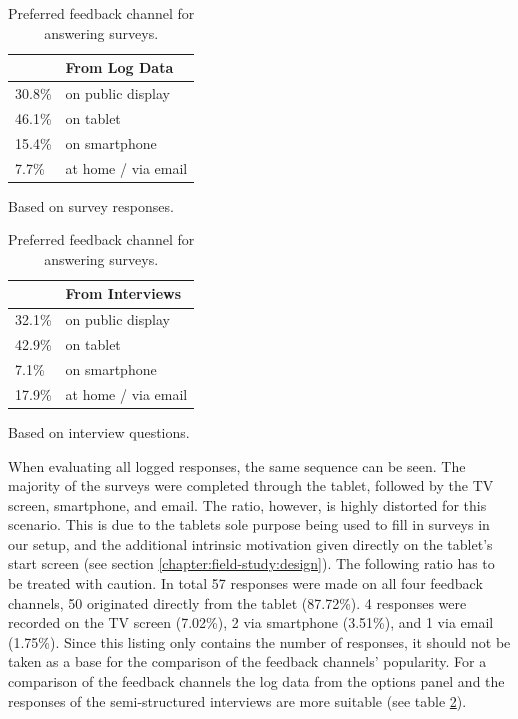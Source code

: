 	\begin{table}[h]



	\parbox{.45\linewidth}{
		\centering
	    \begin{tabular}{ll}
	    \toprule
	    & \textbf{From Log Data}     \\
	    \midrule
	    30.8\%       & on public display     \\
	    46.1\%       & on tablet         \\
	    15.4\%       &  on smartphone          \\
	    7.7\%        &  at home / via email        \\
	    \bottomrule
	    \end{tabular}   
		\caption{Based on survey responses.}
	}
	\hfill
	\parbox{.45\linewidth}{
		\centering
	    \begin{tabular}{ll}
	    \toprule
	    & \textbf{From Interviews} \\
	    \midrule
	    32.1\%       & on public display     \\
	    42.9\%       & on tablet         \\
	    7.1\%       &  on smartphone          \\
	    17.9\%        &  at home / via email        \\
	    \bottomrule
	    \end{tabular} 
   		\caption{Based on interview questions.}
	}


		\caption[Feedback Channel]{Preferred feedback channel for answering surveys.}
		\label{table:5-feedback-channel}
	\end{table}


	When evaluating all logged responses, the same sequence can be seen. The majority of the surveys were completed through the tablet, followed by the TV screen, smartphone, and email. The ratio, however, is highly distorted for this scenario. This is due to the tablets sole purpose being used to fill in surveys in our setup, and the additional intrinsic motivation given directly on the tablet's start screen (see section \ref{chapter:field-study:design}). The following ratio has to be treated with caution. In total 57 responses were made on all four feedback channels, 50 originated directly from the tablet (87.72\%). 4 responses were recorded on the TV screen (7.02\%), 2 via smartphone (3.51\%), and 1 via email (1.75\%). Since this listing only contains the number of responses, it should not be taken as a base for the comparison of the feedback channels' popularity. %
	For a comparison of the feedback channels the log data from the options panel and the responses of the semi-structured interviews are more suitable (see table \ref{table:5-feedback-channel}).




